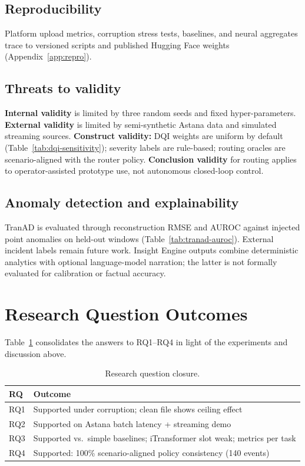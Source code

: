 \subsection{Reproducibility}

Platform upload metrics, corruption stress tests, baselines, and neural aggregates trace to versioned scripts and published Hugging Face weights (Appendix~\ref{app:repro}).

\subsection{Threats to validity}

\textbf{Internal validity} is limited by three random seeds and fixed hyper-parameters. \textbf{External validity} is limited by semi-synthetic Astana data and simulated streaming sources. \textbf{Construct validity:} DQI weights are uniform by default (Table~\ref{tab:dqi-sensitivity}); severity labels are rule-based; routing oracles are scenario-aligned with the router policy. \textbf{Conclusion validity} for routing applies to operator-assisted prototype use, not autonomous closed-loop control.

\subsection{Anomaly detection and explainability}

TranAD is evaluated through reconstruction RMSE and AUROC against injected point anomalies on held-out windows (Table~\ref{tab:tranad-auroc}). External incident labels remain future work. Insight Engine outputs combine deterministic analytics with optional language-model narration; the latter is not formally evaluated for calibration or factual accuracy.

\section{Research Question Outcomes}

Table~\ref{tab:rq-closure} consolidates the answers to RQ1--RQ4 in light of the experiments and discussion above.

\begin{table}[H]
  \centering
  \caption{Research question closure.}
  \label{tab:rq-closure}
  \small
  \begin{tabular}{@{}p{1.2cm}p{9.2cm}@{}}
    \toprule
    \textbf{RQ} & \textbf{Outcome} \\
    \midrule
    RQ1 & Supported under corruption; clean file shows ceiling effect \\
    RQ2 & Supported on Astana batch latency + streaming demo \\
    RQ3 & Supported vs.\ simple baselines; iTransformer slot weak; metrics per task \\
    RQ4 & Supported: 100\% scenario-aligned policy consistency (140 events) \\
    \bottomrule
  \end{tabular}
\end{table}
